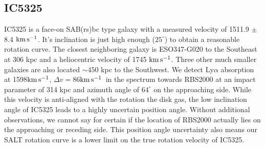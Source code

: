 \documentclass[iop]{emulateapj-rtx4}
\newcommand{\kms}{$\rm km\, s^{-1}$}
\begin{document}
%


\subsection{IC5325}
IC5325 is a face-on SAB(rs)bc type galaxy with a measured velocity of 1511.9 $\pm$ 8.4 \kms. It's inclination is just high enough ($25^{\circ}$) to obtain a reasonable rotation curve. The closest neighboring galaxy is ESO347-G020 to the Southeast at 306 kpc and a heliocentric velocity of 1745 \kms. Three other much smaller galaxies are also located $\sim 450$ kpc to the Southwest. We detect Ly$\alpha$ absorption at 1598\kms, $\Delta v = 86$\kms~in the spectrum towards RBS2000 at an impact parameter of 314 kpc and azimuth angle of $64^{\circ}$ on the approaching side. While this velocity is anti-aligned with the rotation the disk gas, the low inclination angle of IC5325 leads to a highly uncertain position angle. Without additional observations, we cannot say for certain if the location of RBS2000 actually lies on the approaching or receding side. This position angle uncertainty also means our SALT rotation curve is a lower limit on the true rotation velocity of IC5325.



 

%
\end{document}
